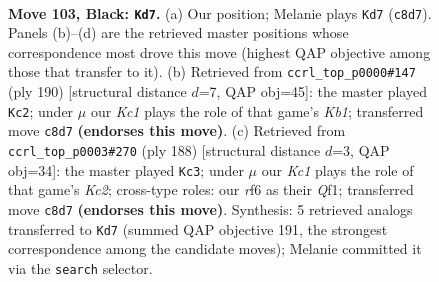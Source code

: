 \documentclass[11pt]{article}
\begin{document}
\clearpage

\begin{figure}[p]\centering
\begin{subfigure}{0.46\textwidth}\centering
\resizebox{\linewidth}{!}{%
\newchessgame
\chessboard[
  setfen={2k3R1/8/5R2/8/8/5K2/8/8 b - - 0 103},
  showmover=false,
  pgfstyle=straightmove, color=movearrow, markmove={c8-d7}
]}
\caption{}
\end{subfigure}\hfill
\begin{subfigure}{0.46\textwidth}\centering
\resizebox{\linewidth}{!}{%
\newchessgame
\chessboard[
  setfen={1k6/8/8/8/8/2R5/8/1K5r w - - 22 96},
  showmover=false,
  pgfstyle=straightmove, color=movearrow, markmove={b1-c2}
]}
\caption{}
\end{subfigure}
\\[4pt]
\begin{subfigure}{0.46\textwidth}\centering
\resizebox{\linewidth}{!}{%
\newchessgame
\chessboard[
  setfen={8/8/8/8/k7/8/r1K5/5Q2 w - - 47 95},
  showmover=false,
  pgfstyle=straightmove, color=movearrow, markmove={c2-c3}
]}
\caption{}
\end{subfigure}\hfill

\caption{\textbf{Move 103, Black: \texttt{Kd7}.} (a) Our position; Melanie plays \texttt{Kd7} (\texttt{c8d7}). Panels (b)--(d) are the retrieved master positions whose correspondence most drove this move (highest QAP objective among those that transfer to it). (b) Retrieved from \texttt{ccrl\_top\_p0000\#147} (ply 190) [structural distance $d$=7, QAP obj=45]: the master played \texttt{Kc2}; under $\mu$ our \emph{Kc1} plays the role of that game's \emph{Kb1}; transferred move \texttt{c8d7} \textbf{(endorses this move)}. (c) Retrieved from \texttt{ccrl\_top\_p0003\#270} (ply 188) [structural distance $d$=3, QAP obj=34]: the master played \texttt{Kc3}; under $\mu$ our \emph{Kc1} plays the role of that game's \emph{Kc2}; cross-type roles: our \emph{r}f6 as their \emph{Q}f1; transferred move \texttt{c8d7} \textbf{(endorses this move)}. Synthesis: 5 retrieved analogs transferred to \texttt{Kd7} (summed QAP objective 191, the strongest correspondence among the candidate moves); Melanie committed it via the \texttt{search} selector.}
\label{fig:thought-m205}
\end{figure}
\end{document}
